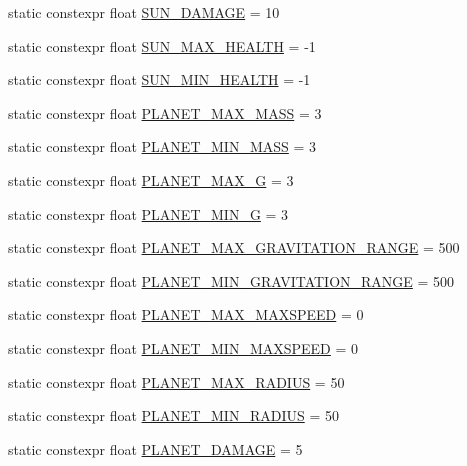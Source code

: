 \begin{DoxyCompactItemize}
static constexpr float \hyperlink{class_act_conf_a6d94247c2ef1780da147e5c93cd0706d}{S\+U\+N\+\_\+\+D\+A\+M\+A\+G\+E} = 10
\item 
static constexpr float \hyperlink{class_act_conf_aabc7f917d25710ff024f8a27f8b8cfc4}{S\+U\+N\+\_\+\+M\+A\+X\+\_\+\+H\+E\+A\+L\+T\+H} = -\/1
\item 
static constexpr float \hyperlink{class_act_conf_a17e84a7884b3369290ae770caf77f233}{S\+U\+N\+\_\+\+M\+I\+N\+\_\+\+H\+E\+A\+L\+T\+H} = -\/1
\item 
static constexpr float \hyperlink{class_act_conf_adf1cdfeab238b57f7224bf2f827b7651}{P\+L\+A\+N\+E\+T\+\_\+\+M\+A\+X\+\_\+\+M\+A\+S\+S} = 3
\item 
static constexpr float \hyperlink{class_act_conf_a5e921f67d1eba22a36ca1b3826a5e286}{P\+L\+A\+N\+E\+T\+\_\+\+M\+I\+N\+\_\+\+M\+A\+S\+S} = 3
\item 
static constexpr float \hyperlink{class_act_conf_adf2d15ca261853672134fb1c38e76429}{P\+L\+A\+N\+E\+T\+\_\+\+M\+A\+X\+\_\+\+G} = 3
\item 
static constexpr float \hyperlink{class_act_conf_afe5b19b63ca93634e7250e877a44af1d}{P\+L\+A\+N\+E\+T\+\_\+\+M\+I\+N\+\_\+\+G} = 3
\item 
static constexpr float \hyperlink{class_act_conf_af000df3a2df946110e196430284d049a}{P\+L\+A\+N\+E\+T\+\_\+\+M\+A\+X\+\_\+\+G\+R\+A\+V\+I\+T\+A\+T\+I\+O\+N\+\_\+\+R\+A\+N\+G\+E} = 500
\item 
static constexpr float \hyperlink{class_act_conf_a67db624789a5664ffc60d227ccdd7cb3}{P\+L\+A\+N\+E\+T\+\_\+\+M\+I\+N\+\_\+\+G\+R\+A\+V\+I\+T\+A\+T\+I\+O\+N\+\_\+\+R\+A\+N\+G\+E} = 500
\item 
static constexpr float \hyperlink{class_act_conf_ab0d1b4f8156e71e7af01b245545f3df0}{P\+L\+A\+N\+E\+T\+\_\+\+M\+A\+X\+\_\+\+M\+A\+X\+S\+P\+E\+E\+D} = 0
\item 
static constexpr float \hyperlink{class_act_conf_a7eaa1d669a20480db880b9e12f8d1f1f}{P\+L\+A\+N\+E\+T\+\_\+\+M\+I\+N\+\_\+\+M\+A\+X\+S\+P\+E\+E\+D} = 0
\item 
static constexpr float \hyperlink{class_act_conf_aa8d0843f0060dfc7e845b3c68d236796}{P\+L\+A\+N\+E\+T\+\_\+\+M\+A\+X\+\_\+\+R\+A\+D\+I\+U\+S} = 50
\item 
static constexpr float \hyperlink{class_act_conf_a1ea01a15c11eb92d06575f05eeb2943e}{P\+L\+A\+N\+E\+T\+\_\+\+M\+I\+N\+\_\+\+R\+A\+D\+I\+U\+S} = 50
\item 
static constexpr float \hyperlink{class_act_conf_a2e862878034cfd5edf2531bc807a0328}{P\+L\+A\+N\+E\+T\+\_\+\+D\+A\+M\+A\+G\+E} = 5

\end{DoxyCompactItemize}
